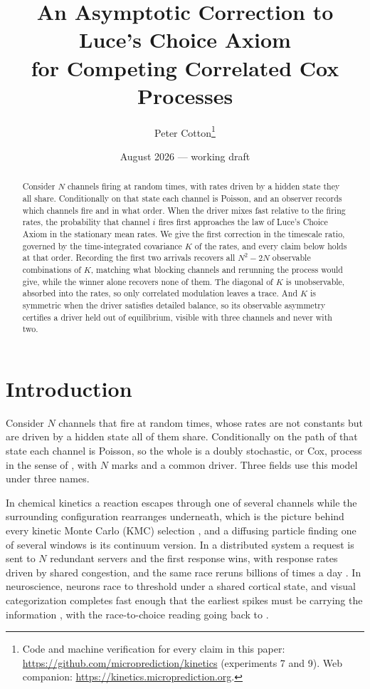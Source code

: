 \documentclass[11pt]{article}
\title{An Asymptotic Correction to Luce's Choice Axiom\\ for Competing Correlated Cox Processes}
\author{Peter Cotton\thanks{Code and machine verification for every claim in this
paper: \url{https://github.com/microprediction/kinetics} (experiments 7 and 9).
Web companion: \url{https://kinetics.microprediction.org}.}}
\date{August 2026 --- working draft}
\theoremstyle{remark}
\begin{document}
\maketitle

\begin{abstract}
Consider $N$ channels firing at random times, with rates driven by a hidden
state they all share. Conditionally on that state each channel is Poisson, and
an observer records which channels fire and in what order. When the driver
mixes fast relative to the firing rates, the probability that channel $i$
fires first approaches the law of Luce's Choice Axiom in the stationary mean
rates. We give the first correction in the timescale ratio, governed by the
time-integrated covariance $K$ of the rates, and every claim below holds at
that order. Recording the first two arrivals recovers all $N^2-2N$ observable
combinations of $K$, matching what blocking channels and rerunning the
process would give, while the winner alone recovers none of them. The
diagonal of $K$ is unobservable, absorbed into the rates, so only correlated
modulation leaves a trace. And $K$ is symmetric when the driver satisfies
detailed balance, so its observable asymmetry certifies a driver held out of
equilibrium, visible with three channels and never with two.
\end{abstract}

\section{Introduction}

Consider $N$ channels that fire at random times, whose rates are not constants
but are driven by a hidden state all of them share. Conditionally on the path
of that state each channel is Poisson, so the whole is a doubly stochastic, or
Cox, process in the sense of \citet{cox1955}, with $N$ marks and a common
driver. Three fields use this model under three names.

In chemical kinetics a reaction escapes through one of several channels while
the surrounding configuration rearranges underneath, which is the picture
behind every kinetic Monte Carlo (KMC) selection \citep{bkl1975,gillespie1977},
and a diffusing particle finding one of several windows is its continuum
version. In a distributed system a request is sent to $N$ redundant servers and
the first response wins, with response rates driven by shared congestion, and
the same race reruns billions of times a day \citep{dean2013}. In
neuroscience, neurons race to threshold under a shared cortical state, and visual
categorization completes fast enough that the earliest spikes must be carrying
the information \citep{thorpe1996}, with the race-to-choice reading going back to
\citet{bundesen1990}.
\end{document}
